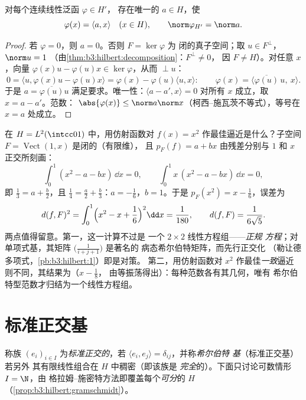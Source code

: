 \begin{theorem}[里斯表示定理]\label{thm:b3:hilbert:riesz}
对每个连续线性泛函 $\varphi \in H'$，
存在唯一的 $a \in H$，使
\[
\varphi(x) = \langle a, x\rangle \quad (x \in H),
\qquad \norm\varphi_{H'} = \norm a .
\]
\end{theorem}

\begin{proof}
若 $\varphi = 0$，则 $a = 0$。否则 $F = \ker\varphi$ 为
闭的真子空间；取 $u \in F^\perp$，$\norm u = 1$
（由\cref{thm:b3:hilbert:decomposition}：$F^\perp \neq 0$，
因 $F \neq H$）。对任意 $x$，向量 $\varphi(x)u -
\varphi(u)x \in \ker\varphi$，从而 $\perp u$：
\[
0 = \langle u, \varphi(x)u - \varphi(u)x\rangle
= \varphi(x) - \varphi(u)\langle u, x\rangle :
\qquad \varphi(x) = \langle
\overline{\varphi(u)}\,u,\ x\rangle .
\]
于是 $a = \overline{\varphi(u)}u$ 满足要求。唯一性：$\langle a
- a', x\rangle = 0$ 对所有 $x$ 成立，取 $x = a - a'$。范数：
$\abs{\varphi(x)} \leq \norm a\norm x$（柯西–施瓦茨不等式），等号在
$x = a$ 处成立。
\end{proof}

\begin{example}[一个投影的完整计算]
\label{ex:b3:hilbert:projectionexample}
在 $H = L^2(\intcc01)$ 中，用仿射函数对
$f(x) = x^2$ 作最佳逼近是什么？子空间 $F =
\operatorname{Vect}(1, x)$ 是闭的（有限维），
且 $p_F(f) = a + bx$ 由残差分别与
$1$ 和 $x$ 正交所刻画：
\[
\int_0^1(x^2 - a - bx)\,\dd x = 0,
\qquad
\int_0^1x\,(x^2 - a - bx)\,\dd x = 0,
\]
即 $\frac13 = a + \frac b2$，且 $\frac14 = \frac a2 +
\frac b3$：$a = -\frac16$，$b = 1$。于是 $p_F(x^2) = x -
\frac16$，误差为
\[
d(f, F)^2 = \int_0^1\Bigl(x^2 - x + \frac16\Bigr)^2\dd x =
\frac1{180},
\qquad d(f, F) = \frac1{6\sqrt5} .
\]
两点值得留意。第一，这一计算不过是
一个 $2\times2$ 线性方程组——\emph{正规
方程}；对单项式基，其矩阵
$\bigl(\frac1{i+j+1}\bigr)$ 是著名的
病态希尔伯特矩阵，而先行正交化
（勒让德多项式，\cref{pb:b3:hilbert:1}）即是对策。
第二，用仿射函数对 $x^2$ 作最佳\emph{一致}逼近
则不同，其结果为（$x - \frac18$，
由等振荡得出）：每种范数各有其几何，唯有
希尔伯特型范数才归结为一个线性方程组。
\end{example}

\section{标准正交基}

\begin{definition}\label{def:b3:hilbert:onb}
称族 $(e_i)_{i\in I}$ 为\emph{标准正交的}，若 $\langle
e_i, e_j\rangle = \delta_{ij}$，并称\emph{希尔伯特
基}（标准正交基）若另外
其有限线性组合在 $H$ 中稠密（即该族是
\emph{完全}的）。下面只讨论可数情形 $I = \N$，由
格拉姆–施密特方法即覆盖每个\emph{可分}的 $H$
（\cref{prop:b3:hilbert:gramschmidt}）。
\end{definition}

